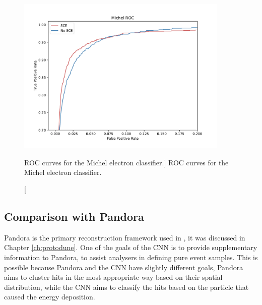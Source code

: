 \begin{figure}
	\centering
	\includegraphics[width=0.9\textwidth]{figures/michel_roc_comparison.pdf}
	\caption
	[ROC curves for the Michel electron classifier.]
	{ROC curves for the Michel electron classifier.}
	\label{fig:michel_roc}
\end{figure}

\subsection{Comparison with Pandora}
Pandora is the primary reconstruction framework used in \protodune{}, it was
discussed in Chapter \ref{ch:protodune}. One of the goals of the CNN is to
provide supplementary information to Pandora, to assist analysers in defining 
pure event samples. This is possible because Pandora and the CNN have slightly
different goals, Pandora aims to cluster hits in the most appropriate way based
on their spatial distribution, while the CNN aims to classify the hits based on 
the particle that caused the energy deposition.

